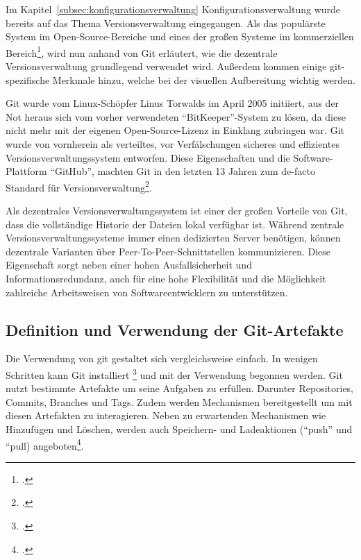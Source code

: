 Im Kapitel~\ref{subsec:konfigurationsverwaltung} Konfigurationsverwaltung wurde bereits auf das Thema Versionsverwaltung eingegangen. Als das populärste System im Open-Source-Bereiche und eines der großen Systeme im kommerziellen Bereich\footcite{g2crowd2018}, wird nun anhand von Git erläutert, wie die dezentrale Versionsverwaltung grundlegend verwendet wird. Außerdem kommen einige git-spezifische Merkmale hinzu, welche bei der visuellen Aufbereitung wichtig werden.

Git wurde vom Linux-Schöpfer Linus Torwalds im April 2005 initiiert, aus der Not heraus sich vom vorher verwendeten ``BitKeeper''-System zu lösen, da diese nicht mehr mit der eigenen Open-Source-Lizenz in Einklang zubringen war. Git wurde von vornherein als verteiltes, vor Verfälschungen sicheres und effizientes Versionsverwaltungssystem entworfen. Diese Eigenschaften und die Software-Plattform ``GitHub'', machten Git in den letzten 13 Jahren zum de-facto Standard für Versionsverwaltung\footcite{heise-torvald-git2015}.

Als dezentrales Versionsverwaltungssystem ist einer der großen Vorteile von Git, dass die vollständige Historie der Dateien lokal verfügbar ist. Während zentrale Versionsverwaltungssysteme immer einen dedizierten Server benötigen, können dezentrale Varianten über Peer-To-Peer-Schnittstellen kommunizieren. Diese Eigenschaft sorgt neben einer hohen Ausfallsicherheit und Informationsredundanz, auch für eine hohe Flexibilität und die Möglichkeit zahlreiche Arbeitsweisen von Softwareentwicklern zu unterstützen.

\subsection{Definition und Verwendung der Git-Artefakte}

Die Verwendung von git gestaltet sich vergleichsweise einfach. In wenigen Schritten kann Git installiert \footcite{git-scm-install} und mit der Verwendung begonnen werden. 
Git nutzt bestimmte Artefakte um seine Aufgaben zu erfüllen. Darunter Repositories, Commits, Branches und Tags. Zudem werden Mechanismen bereitgestellt um mit diesen Artefakten zu interagieren. Neben zu erwartenden Mechanismen wie Hinzufügen und Löschen, werden auch Speichern- und Ladeaktionen (``push'' und ``pull) angeboten\footcite{git-essentials-2017}.

